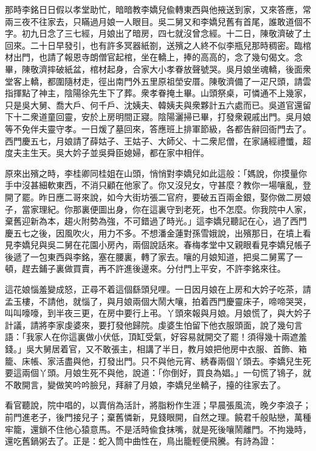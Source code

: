 那時李銘日日假以孝堂助忙，暗暗教李嬌兒偸轉東西與他掖送到家，又來答應，常兩三夜不往家去，只瞞過月娘一人眼目。吳二舅又和李嬌兒舊有首尾，誰敢道個不字。初九日念了三七經，月娘出了暗房，四七就沒曾念經。十二日，陳敬濟破了土回來。二十日早發引，也有許多冥器紙劄，送殯之人終不似李瓶兒那時稠密。臨棺材出門，也請了報恩寺朗僧官起棺，坐在轎上，捧的高高的，念了幾句偈文。念畢，陳敬濟摔破紙盆，棺材起身，合家大小孝眷放聲號哭。吳月娘坐魂轎，後面衆堂客上轎，都圍隨材走，徑出南門外五里原祖塋安厝。陳敬濟備了一疋尺頭，請雲指揮點了神主，陰陽徐先生下了葬。衆孝眷掩土畢。山頭祭桌，可憐通不上幾家，只是吳大舅、喬大戶、何千戶、沈姨夫、韓姨夫與衆夥計五六處而已。吳道官還留下十二衆道童回靈，安於上房明間正寢。陰陽灑掃已畢，打發衆親戚出門。吳月娘等不免伴夫靈守孝。一日煖了墓回來，答應班上排軍節級，各都告辭回衙門去了。西門慶五七，月娘請了薛姑子、王姑子、大師父、十二衆尼僧，在家誦經禮懺，超度夫主生天。吳大妗子並吳舜臣媳婦，都在家中相伴。

原來出殯之時，李桂卿同桂姐在山頭，悄悄對李嬌兒如此這般：「媽說，你摸量你手中沒甚細軟東西，不消只顧在他家了。你又沒兒女，守甚麼？教你一場嚷亂，登開了罷。{}昨日應二哥來說，如今大街坊張二官府，要破五百兩金銀，娶你做二房娘子，當家理紀。你那裏便圖出身，你在這裏守到老死，也不怎麼。你我院中人家，棄舊迎新為本，趨火附勢為強，不可錯過了時光。」這李嬌兒聽記在心，過了西門慶五七之後，因風吹火，用力不多。不想潘金蓮對孫雪娥說，出殯那日，在墳上看見李嬌兒與吳二舅在花園小房內，兩個說話來。春梅孝堂中又親眼看見李嬌兒帳子後遞了一包東西與李銘，塞在腰裏，轉了家去。{}嚷的月娘知道，把吳二舅罵了一頓，趕去鋪子裏做買賣，再不許進後邊來。分付門上平安，不許李銘來往。

這花娘惱羞變成怒，正尋不着這個繇頭兒哩。一日因月娘在上房和大妗子吃茶，請孟玉樓，不請他，就惱了，與月娘兩個大鬧大嚷，拍着西門慶靈床子，啼啼哭哭，叫叫嚎嚎，到半夜三更，在房中要行上弔。丫頭來報與月娘。月娘慌了，與大妗子計議，請將李家虔婆來，要打發他歸院。虔婆生怕留下他衣服頭面，說了幾句言語：「我家人在你這裏做小伏低，頂缸受氣，好容易就開交了罷！須得幾十兩遮羞錢。」{}吳大舅居着官，又不敢張主，相講了半日，教月娘把他房中衣服、首飾、箱籠、床帳、家活盡與他，打發出門。只不與他元宵、綉春兩個丫頭去。李嬌兒生死要這兩個丫頭。月娘生死不與他，說道：「你倒好，買良為娼。」一句慌了鴇子，就不敢開言，變做笑吟吟臉兒，拜辭了月娘，李嬌兒坐轎子，擡的往家去了。

看官聽說，院中唱的，以賣俏為活計，將脂粉作生涯；早晨張風流，晚夕李浪子；前門進老子，後門接兒子；棄舊憐新，見錢眼開，自然之理。饒君千般貼戀，萬種牢籠，還鎖不住他心猿意馬。不是活時偸食抹嘴，就是死後嚷鬧離門。不拘幾時，還吃舊鍋粥去了。正是：蛇入筒中曲性在，鳥出籠輕便飛騰。有詩為證：

